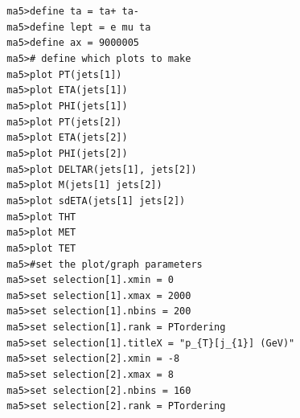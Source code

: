 \documentclass[a4paper, 10pt]{article}
\begin{document}
\texttt{ }\texttt{ }\texttt{ma5>define ta = ta+ ta-\\
}
\texttt{ }\texttt{ }\texttt{ma5>define lept = e mu ta\\
}
\texttt{ }\texttt{ }\texttt{ma5>define ax = 9000005\\
}
\texttt{ }\texttt{ }\texttt{ma5>\# define which plots to make\\
}
\texttt{ }\texttt{ }\texttt{ma5>plot PT(jets[1])\\
}
\texttt{ }\texttt{ }\texttt{ma5>plot ETA(jets[1])\\
}
\texttt{ }\texttt{ }\texttt{ma5>plot PHI(jets[1])\\
}
\texttt{ }\texttt{ }\texttt{ma5>plot PT(jets[2])\\
}
\texttt{ }\texttt{ }\texttt{ma5>plot ETA(jets[2])\\
}
\texttt{ }\texttt{ }\texttt{ma5>plot PHI(jets[2])\\
}
\texttt{ }\texttt{ }\texttt{ma5>plot DELTAR(jets[1], jets[2])\\
}
\texttt{ }\texttt{ }\texttt{ma5>plot M(jets[1] jets[2])\\
}
\texttt{ }\texttt{ }\texttt{ma5>plot sdETA(jets[1] jets[2])\\
}
\texttt{ }\texttt{ }\texttt{ma5>plot THT\\
}
\texttt{ }\texttt{ }\texttt{ma5>plot MET\\
}
\texttt{ }\texttt{ }\texttt{ma5>plot TET\\
}
\texttt{ }\texttt{ }\texttt{ma5>\#set the plot/\-graph parameters\\
}
\texttt{ }\texttt{ }\texttt{ma5>set selection[1].xmin = 0\\
}
\texttt{ }\texttt{ }\texttt{ma5>set selection[1].xmax = 2000\\
}
\texttt{ }\texttt{ }\texttt{ma5>set selection[1].nbins = 200\\
}
\texttt{ }\texttt{ }\texttt{ma5>set selection[1].rank = PTordering\\
}
\texttt{ }\texttt{ }\texttt{ma5>set selection[1].titleX = "p\_\{T\}[j\_\{1\}] (GeV)"\\
}
\texttt{ }\texttt{ }\texttt{ma5>set selection[2].xmin = -8\\
}
\texttt{ }\texttt{ }\texttt{ma5>set selection[2].xmax = 8\\
}
\texttt{ }\texttt{ }\texttt{ma5>set selection[2].nbins = 160\\
}
\texttt{ }\texttt{ }\texttt{ma5>set selection[2].rank = PTordering\\
}
\end{document}
